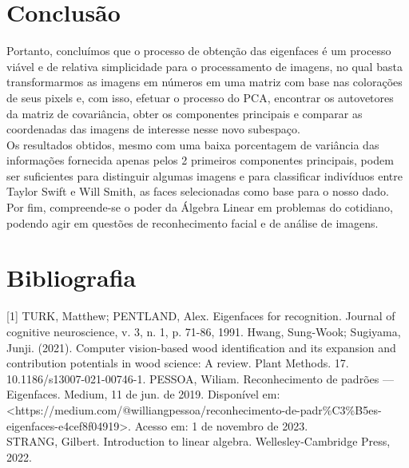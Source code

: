\documentclass{article}
\begin{document}
\section{Conclusão}
Portanto, concluímos que o processo de obtenção das eigenfaces é um processo viável e de relativa simplicidade para o processamento de imagens, no qual basta transformarmos as imagens em números em uma matriz com base nas colorações de seus pixels e, com isso, efetuar o processo do PCA, encontrar os autovetores da matriz de covariância, obter os componentes principais e comparar as coordenadas das imagens de interesse nesse novo subespaço. \\

Os resultados obtidos, mesmo com uma baixa porcentagem de variância das informações fornecida apenas pelos 2 primeiros componentes principais, podem ser suficientes para distinguir algumas imagens e para classificar indivíduos entre Taylor Swift e Will Smith, as faces selecionadas como base para o nosso dado. \\

Por fim, compreende-se o poder da Álgebra Linear em problemas do cotidiano, podendo agir em questões de reconhecimento facial e de análise de imagens.

\section{Bibliografia}
[1] TURK, Matthew; PENTLAND, Alex. Eigenfaces for recognition. Journal of cognitive neuroscience, v. 3, n. 1, p. 71-86, 1991. \newline
\indent [2] Hwang, Sung-Wook; Sugiyama, Junji. (2021). Computer vision-based wood identification and its expansion and contribution potentials in wood science: A review. Plant Methods. 17. 10.1186/s13007-021-00746-1. \newline
\indent [3] PESSOA, Wiliam. Reconhecimento de padrões — Eigenfaces. Medium, 11 de jun. de 2019. Disponível em: <https://medium.com/@williangpessoa/reconhecimento-de-padr\%C3\%B5es-eigenfaces-e4cef8f04919>. Acesso em: 1 de novembro de 2023. \\
\indent[4] STRANG, Gilbert. Introduction to linear algebra. Wellesley-Cambridge Press, 2022.
\end{document}
